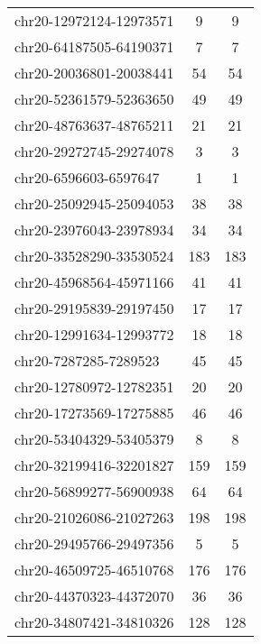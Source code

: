 \begin{longtable}{lSS}
	chr20-12972124-12973571 & 9    & 9                               \\
	chr20-64187505-64190371 & 7    & 7                               \\
	chr20-20036801-20038441 & 54   & 54                              \\
	chr20-52361579-52363650 & 49   & 49                              \\
	chr20-48763637-48765211 & 21   & 21                              \\
	chr20-29272745-29274078 & 3    & 3                               \\
	chr20-6596603-6597647   & 1    & 1                               \\
	chr20-25092945-25094053 & 38   & 38                              \\
	chr20-23976043-23978934 & 34   & 34                              \\
	chr20-33528290-33530524 & 183  & 183                             \\
	chr20-45968564-45971166 & 41   & 41                              \\
	chr20-29195839-29197450 & 17   & 17                              \\
	chr20-12991634-12993772 & 18   & 18                              \\
	chr20-7287285-7289523   & 45   & 45                              \\
	chr20-12780972-12782351 & 20   & 20                              \\
	chr20-17273569-17275885 & 46   & 46                              \\
	chr20-53404329-53405379 & 8    & 8                               \\
	chr20-32199416-32201827 & 159  & 159                             \\
	chr20-56899277-56900938 & 64   & 64                              \\
	chr20-21026086-21027263 & 198  & 198                             \\
	chr20-29495766-29497356 & 5    & 5                               \\
	chr20-46509725-46510768 & 176  & 176                             \\
	chr20-44370323-44372070 & 36   & 36                              \\
	chr20-34807421-34810326 & 128  & 128                             \\

\end{longtable}
